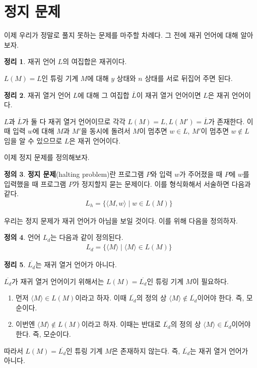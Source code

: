 \documentclass[b5paper, 11pt]{book}
\theoremstyle{definition}
\newtheorem{defn}{정의}[chapter]
\newtheorem{thm}[defn]{정리}
\newenvironment{pf*}{\pushQED{\qed}\pf}
{\popQED\endpf}
\begin{document}
\section{정지 문제}
이제 우리가 정말로 풀지 못하는 문제를 마주할 차례다. 그 전에 재귀 언어에 대해 알아보자.
\begin{thm}
    재귀 언어 $L$의 여집합은 재귀이다.
\end{thm}
\begin{pf*}
    $L(M) = L$인 튜링 기계 $M$에 대해 $y$ 상태와 $n$ 상태를 서로 뒤집어 주면 된다.
\end{pf*}
\begin{thm}
    재귀 열거 언어 $L$에 대해 그 여집합 $\overline{L}$이 재귀 열거 언어이면 $L$은 재귀 언어이다.
\end{thm}
\begin{pf*}
    $L$과 $\overline{L}$가 둘 다 재귀 열거 언어이므로 각각 $L(M) = L, L(M') = \overline{L}$가 존재한다. 이때 입력 $w$에 대해 $M$과 $M'$을 동시에 돌려서 $M$이 멈추면 $w \in L$, $M'$이 멈추면 $w \notin L$임을 알 수 있으므로 $L$은 재귀 언어이다. 
\end{pf*}
이제 정지 문제를 정의해보자. 
\begin{defn}
    \textbf{정지 문제}(halting problem)란 프로그램 $P$와 입력 $w$가 주어졌을 때 $P$에 $w$를 입력했을 때 프로그램 $P$가 정지할지 묻는 문제이다. 이를 형식화해서 서술하면 다음과 같다.
    \begin{align*}
        L_h = \{ \langle M, w \rangle \;\vert\; w \in L(M) \}
    \end{align*}
\end{defn}
우리는 정지 문제가 재귀 언어가 아님을 보일 것이다. 이를 위해 다음을 정의하자.
\begin{defn}
    언어 $L_d$는 다음과 같이 정의된다.
    \begin{align*}
        L_d = \{ \langle M \rangle \;\vert\; \langle M \rangle \in L(M) \}
    \end{align*}
\end{defn}
\begin{thm}\label{Ldc not re}
    $\overline{L_d}$는 재귀 열거 언어가 아니다. 
\end{thm}
\begin{pf*}
    $\overline{L_d}$가 재귀 열거 언어이기 위해서는 $L(M) = \overline{L_d}$인 튜링 기계 $M$이 필요하다.
    \begin{enumerate}
        \item  먼저 $\langle M \rangle \in L(M)$이라고 하자. 이때 $\overline{L_d}$의 정의 상 $\langle M \rangle \notin \overline{L_d}$이어야 한다. 즉, 모순이다.
        \item  이번엔 $\langle M \rangle \notin L(M)$이라고 하자. 이때는 반대로 $\overline{L_d}$의 정의 상 $\langle M \rangle \in \overline{L_d}$이어야 한다. 즉, 모순이다. 
    \end{enumerate}
    따라서 $L(M) = \overline{L_d}$인 튜링 기계 $M$은 존재하지 않는다. 즉, $\overline{L_d}$는 재귀 열거 언어가 아니다.
\end{pf*}
\end{document}
